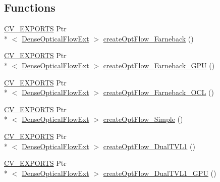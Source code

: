 \subsection*{Functions}
\begin{DoxyCompactItemize}
\item 
\hyperlink{core_2types__c_8h_a1bf9f0e121b54272da02379cfccd0a2b}{C\-V\-\_\-\-E\-X\-P\-O\-R\-T\-S} Ptr\\*
$<$ \hyperlink{classcv_1_1superres_1_1DenseOpticalFlowExt}{Dense\-Optical\-Flow\-Ext} $>$ \hyperlink{namespacecv_1_1superres_aaef538f78e89ac9bba34a67aeea44e3f}{create\-Opt\-Flow\-\_\-\-Farneback} ()
\item 
\hyperlink{core_2types__c_8h_a1bf9f0e121b54272da02379cfccd0a2b}{C\-V\-\_\-\-E\-X\-P\-O\-R\-T\-S} Ptr\\*
$<$ \hyperlink{classcv_1_1superres_1_1DenseOpticalFlowExt}{Dense\-Optical\-Flow\-Ext} $>$ \hyperlink{namespacecv_1_1superres_a6307ed60786e73808e0cee31f81520be}{create\-Opt\-Flow\-\_\-\-Farneback\-\_\-\-G\-P\-U} ()
\item 
\hyperlink{core_2types__c_8h_a1bf9f0e121b54272da02379cfccd0a2b}{C\-V\-\_\-\-E\-X\-P\-O\-R\-T\-S} Ptr\\*
$<$ \hyperlink{classcv_1_1superres_1_1DenseOpticalFlowExt}{Dense\-Optical\-Flow\-Ext} $>$ \hyperlink{namespacecv_1_1superres_ab44d0265899a460071c2de366b66cf78}{create\-Opt\-Flow\-\_\-\-Farneback\-\_\-\-O\-C\-L} ()
\item 
\hyperlink{core_2types__c_8h_a1bf9f0e121b54272da02379cfccd0a2b}{C\-V\-\_\-\-E\-X\-P\-O\-R\-T\-S} Ptr\\*
$<$ \hyperlink{classcv_1_1superres_1_1DenseOpticalFlowExt}{Dense\-Optical\-Flow\-Ext} $>$ \hyperlink{namespacecv_1_1superres_a106001adc3098e68abec046a436e5d0e}{create\-Opt\-Flow\-\_\-\-Simple} ()
\item 
\hyperlink{core_2types__c_8h_a1bf9f0e121b54272da02379cfccd0a2b}{C\-V\-\_\-\-E\-X\-P\-O\-R\-T\-S} Ptr\\*
$<$ \hyperlink{classcv_1_1superres_1_1DenseOpticalFlowExt}{Dense\-Optical\-Flow\-Ext} $>$ \hyperlink{namespacecv_1_1superres_a90cb309a155928946d45368ab5c372df}{create\-Opt\-Flow\-\_\-\-Dual\-T\-V\-L1} ()
\item 
\hyperlink{core_2types__c_8h_a1bf9f0e121b54272da02379cfccd0a2b}{C\-V\-\_\-\-E\-X\-P\-O\-R\-T\-S} Ptr\\*
$<$ \hyperlink{classcv_1_1superres_1_1DenseOpticalFlowExt}{Dense\-Optical\-Flow\-Ext} $>$ \hyperlink{namespacecv_1_1superres_ae68318db5e275e088286215485eb9a48}{create\-Opt\-Flow\-\_\-\-Dual\-T\-V\-L1\-\_\-\-G\-P\-U} ()

\end{DoxyCompactItemize}
